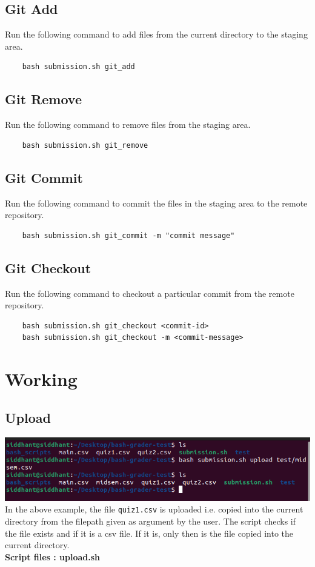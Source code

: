 \documentclass{article}
\begin{document}
\subsection{Git Add}
Run the following command to add files from the current directory to the staging area.
\begin{verbatim}
    bash submission.sh git_add
\end{verbatim}

\subsection{Git Remove}
Run the following command to remove files from the staging area.
\begin{verbatim}
    bash submission.sh git_remove
\end{verbatim}

\subsection{Git Commit}
Run the following command to commit the files in the staging area to the remote repository.
\begin{verbatim}
    bash submission.sh git_commit -m "commit message"
\end{verbatim}

\subsection{Git Checkout}
Run the following command to checkout a particular commit from the remote repository.
\begin{verbatim}
    bash submission.sh git_checkout <commit-id> 
    bash submission.sh git_checkout -m <commit-message>
\end{verbatim}
\newpage

\section{Working}
\subsection{Upload}
\includegraphics[width=\textwidth]{upload.png}
In the above example, the file \verb"quiz1.csv" is uploaded i.e. copied into the current directory from the filepath given as argument by the user.
The script checks if the file exists and if it is a csv file. If it is, only then is the file copied into the current directory.\\
\textbf{Script files : upload.sh }
\end{document}
